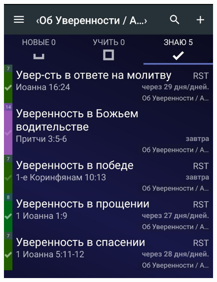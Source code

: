 \documentclass[t,aspectratio=169,14pt]{beamer}  %
\begin{document}
\begin{frame}[c]
\begin{multicols}{2}
\begin{center}
\begin{figure}
			\includegraphics[height=0.8\textheight]{remember-me-lists}
			\end{figure}		
		\end{center}
	 \end{multicols}
\end{frame}
\end{document}
